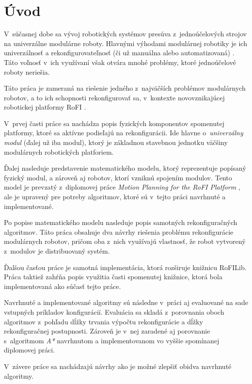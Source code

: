 \documentclass[
  printed, %
  oneside, %
  notable,   %
  nolof,     %
  nolot,     %
]{fithesis3}
\begin{document}
\chapter*{Úvod}
V~súčasnej dobe sa vývoj robotických systémov presúva z~jednoúčelových strojov na univerzálne modulárne roboty. Hlavnými výhodami modulárnej robotiky je ich univerzálnosť a rekonfigurovateľnosť (či už manuálna alebo automatizovaná) \cite{modularAdvantage}. Táto voľnosť v~ich využívaní však otvára mnohé problémy, ktoré jednoúčelové roboty neriešia. 

Táto práca je zameraná na riešenie jedného z~najväčších problémov modulárnych robotov, a to ich schopnosti rekonfigurovať sa, v~kontexte novovznikajúcej robotickej platformy RoFI \cite{rofiWeb}. 

V~prvej časti práce sa nachádza popis fyzických komponentov spomenutej platformy, ktoré sa aktívne podieľajú na rekonfigurácii. Ide hlavne o~\textit{univerzálny modul} (ďalej už iba modul), ktorý je základnou stavebnou jednotku väčšiny modulárnych robotických platforiem. 

Ďalej nasleduje predstavenie matematického modelu, ktorý reprezentuje popísaný fyzický modul, a zároveň aj robotov, ktorí vzniknú spojením modulov. Tento model je prevzatý z~diplomovej práce \textit{Motion Planning for the RoFI Platform} \cite{vozarovaMasterThesis}, ale je upravený pre potreby algoritmov, ktoré sú v~tejto práci navrhnuté a implementované. 

Po popise matematického modelu nasleduje popis samotných rekonfiguračných algoritmov. Táto práca obsahuje dva návrhy riešenia problému rekonfigurácie modulárnych robotov, pričom oba z~nich využívajú vlastnosť, že robot vytvorený z~modulov je distribuovaný systém. 

Ďalšou časťou práce je samotná implementácia, ktorá rozširuje knižnicu RoFILib. Práca taktiež zahŕňa popis využitia časti spomenutej knižnice, ktorá bola implementovaná ako súčasť tejto práce. 

Navrhnuté a implementované algoritmy sú následne v~práci aj evaluované na sade vstupných príkladov konfigurácií. Evaluácia sa skladá z~porovnania oboch algoritmov z~pohľadu dĺžky trvania výpočtu rekonfigurácie a dĺžky rekonfiguračnej postupnosti. Zároveň je v~nej zaradené aj porovnanie s~algoritmom \textit{A*} navrhnutom a implementovanom vo vyššie spomínanej diplomovej práci. 

V~závere práce sa nachádzajú návrhy ako je možné zlepšiť obidva navrhnuté algoritmy. 
\end{document}
